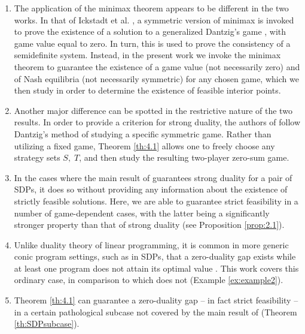 \documentclass[11pt, twoside]{article}
\numberwithin{equation}{section}
\theoremstyle{definition}
\begin{document}
\begin{enumerate}
    \item The application of the minimax theorem appears to be different in the two works. In that of Ickstadt et al. \cite{ickstadt2024semidefinite}, a symmetric version of minimax is invoked to prove the existence of a solution to a generalized Dantzig's game \cite{dantzig1951proof}, with game value equal to zero. In turn, this is used to prove the consistency of a semidefinite system. Instead, in the present work we invoke the minimax theorem to guarantee the existence of a game value (not necessarily zero) and of Nash equilibria (not necessarily symmetric) for any chosen game, which we then study in order to determine the existence of feasible interior points.\vspace{-0.1cm}
     \item Another major difference can be spotted in the restrictive nature of the two results. In order to provide a criterion for strong duality, the authors of \cite{ickstadt2024semidefinite} follow Dantzig's method of studying a specific symmetric game. Rather than utilizing a fixed game, Theorem \ref{th:4.1} allows one to freely choose any strategy sets $S,\;T$, and then study the resulting two-player zero-sum game.\vspace{-0.1cm}
    \item In the cases where the main result of \cite{ickstadt2024semidefinite} guarantees strong duality for a pair of SDPs, it does so without providing any information about the existence of strictly feasible solutions. Here, we are able to guarantee strict feasibility in a number of game-dependent cases, with the latter being a significantly stronger property than that of strong duality (see Proposition \ref{prop:2.1}).\vspace{-0.1cm}
    \item Unlike duality theory of linear programming, it is common in more generic conic program settings, such as in SDPs, that a zero-duality gap exists while at least one program does not attain its optimal value \cite[Example 4.1.1]{wolkowicz2012handbook}. This work covers this ordinary case, in comparison to \cite{ickstadt2024semidefinite} which does not  (Example \ref{ex:example2}).\vspace{-0.1cm}
    \item Theorem \ref{th:4.1} can guarantee a zero-duality gap -- in fact strict feasibility -- in a certain pathological subcase not covered by the main result of \cite{ickstadt2024semidefinite} (Theorem \ref{th:SDPsubcase}).
\end{enumerate}
\end{document}

